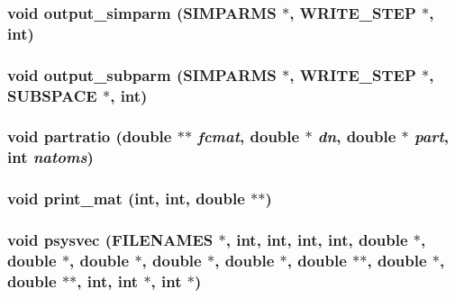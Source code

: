 \subsubsection{\setlength{\rightskip}{0pt plus 5cm}void output\_\-simparm ({\bf SIMPARMS} $\ast$, {\bf WRITE\_\-STEP} $\ast$, int)}\label{proto__output_8h_531130be1bfd2b001d36586804aff399}


\subsubsection{\setlength{\rightskip}{0pt plus 5cm}void output\_\-subparm ({\bf SIMPARMS} $\ast$, {\bf WRITE\_\-STEP} $\ast$, {\bf SUBSPACE} $\ast$, int)}\label{proto__output_8h_e3695f362218ac1ddc91befe181386fc}


\subsubsection{\setlength{\rightskip}{0pt plus 5cm}void partratio (double $\ast$$\ast$ {\em fcmat}, double $\ast$ {\em dn}, double $\ast$ {\em part}, int {\em natoms})}\label{proto__output_8h_f16ff482025a0122cbc39dfa823e5fa5}


\subsubsection{\setlength{\rightskip}{0pt plus 5cm}void print\_\-mat (int, int, double $\ast$$\ast$)}\label{proto__output_8h_8506db5128ef7e8d1e2af6dc56340aec}


\subsubsection{\setlength{\rightskip}{0pt plus 5cm}void psysvec ({\bf FILENAMES} $\ast$, int, int, int, int, double $\ast$, double $\ast$, double $\ast$, double $\ast$, double $\ast$, double $\ast$$\ast$, double $\ast$, double $\ast$$\ast$, int, int $\ast$, int $\ast$)}\label{proto__output_8h_f65b2114197eda1c0c8a56ffca3c465d}


